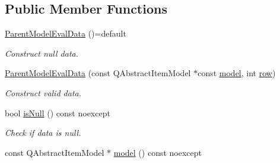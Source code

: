 \subsection*{Public Member Functions}
\begin{DoxyCompactItemize}
\item 
\hyperlink{class_mdt_1_1_item_model_1_1_expression_1_1_parent_model_eval_data_af6e8684d831d7fcd806dba44e18acdec}{Parent\+Model\+Eval\+Data} ()=default\hypertarget{class_mdt_1_1_item_model_1_1_expression_1_1_parent_model_eval_data_af6e8684d831d7fcd806dba44e18acdec}{}\label{class_mdt_1_1_item_model_1_1_expression_1_1_parent_model_eval_data_af6e8684d831d7fcd806dba44e18acdec}

\begin{DoxyCompactList}\small\item\em Construct null data. \end{DoxyCompactList}\item 
\hyperlink{class_mdt_1_1_item_model_1_1_expression_1_1_parent_model_eval_data_ab63a7ee1683c100be8104553c28d9d55}{Parent\+Model\+Eval\+Data} (const Q\+Abstract\+Item\+Model $\ast$const \hyperlink{class_mdt_1_1_item_model_1_1_expression_1_1_parent_model_eval_data_a01d2f8e2c837e5160a833a14c2c205ea}{model}, int \hyperlink{class_mdt_1_1_item_model_1_1_expression_1_1_parent_model_eval_data_a036c01a32b528b284583872dd6bda7b1}{row})
\begin{DoxyCompactList}\small\item\em Construct valid data. \end{DoxyCompactList}\item 
bool \hyperlink{class_mdt_1_1_item_model_1_1_expression_1_1_parent_model_eval_data_ac876614f63e60a4aaab563d10ddb3b74}{is\+Null} () const noexcept\hypertarget{class_mdt_1_1_item_model_1_1_expression_1_1_parent_model_eval_data_ac876614f63e60a4aaab563d10ddb3b74}{}\label{class_mdt_1_1_item_model_1_1_expression_1_1_parent_model_eval_data_ac876614f63e60a4aaab563d10ddb3b74}

\begin{DoxyCompactList}\small\item\em Check if data is null. \end{DoxyCompactList}\item 
const Q\+Abstract\+Item\+Model $\ast$ \hyperlink{class_mdt_1_1_item_model_1_1_expression_1_1_parent_model_eval_data_a01d2f8e2c837e5160a833a14c2c205ea}{model} () const noexcept\hypertarget{class_mdt_1_1_item_model_1_1_expression_1_1_parent_model_eval_data_a01d2f8e2c837e5160a833a14c2c205ea}{}\label{class_mdt_1_1_item_model_1_1_expression_1_1_parent_model_eval_data_a01d2f8e2c837e5160a833a14c2c205ea}


\end{DoxyCompactItemize}
